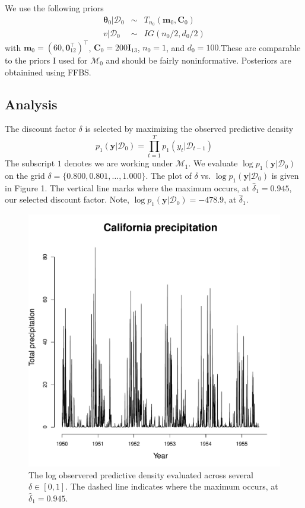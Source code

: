 \documentclass[12pt]{article}
\newcommand{\m}[1]{\mathbf{\bm{#1}}}
\begin{document}
\noindent We use the following priors
\begin{eqnarray*}
\m{\theta}_0|\mathcal{D}_0 &\sim& T_{n_0}(\m{m}_0, \m{C}_0) \\
v|\mathcal{D}_0 &\sim& IG(n_0/2,d_0/2)
\end{eqnarray*}
\noindent with $\m{m}_0=(60, \m{0}_{12}^\top)^\top$, $\m{C}_0=200\m{I}_{13}$, $n_0=1$, and $d_0=100$.These are comparable to the priors I used for $\mathcal{M}_0$ and should be fairly noninformative. Posteriors are obtainined using FFBS.

\subsection*{Analysis}

\noindent The discount factor $\delta$ is selected by maximizing the observed predictive density
\[ p_1(\m{y}|\mathcal{D}_0) = \prod_{t=1}^T p_1(y_t|\mathcal{D}_{t-1}) \]
\noindent The subscript $1$ denotes we are working under $\mathcal{M}_1$. We evaluate $\log p_1(\m{y}|\mathcal{D}_0)$ on the grid $\delta=\{0.800, 0.801,\ldots,1.000\}$. The plot of $\delta$ vs. $\log p_1(\m{y}|\mathcal{D}_0)$ is given in Figure 1. The vertical line marks where the maximum occurs, at $\hat{\delta}_1=0.945$, our selected discount factor. Note, $\log p_1(\m{y}|\mathcal{D}_0)=-478.9$, at $\hat{\delta}_1$.
\bigskip

\begin{figure}[H]
\begin{center}
\includegraphics[scale=0.34]{../figs/data.pdf}
\end{center}
\caption{The log observered predictive density evaluated across several $\delta\in[0,1]$. The dashed line indicates where the maximum occurs, at $\hat{\delta}_1=0.945$.}
\end{figure}
\end{document}
